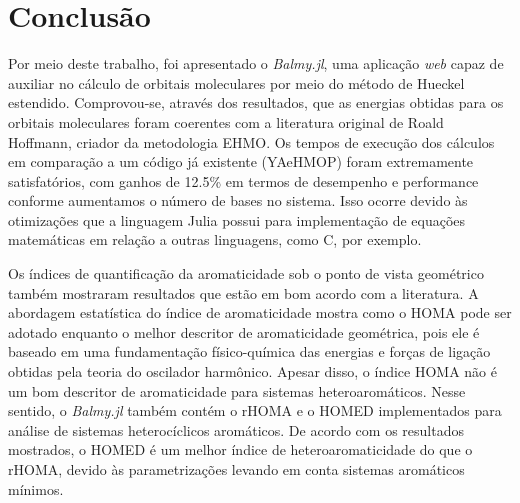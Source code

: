 \chapter{Conclusão}

Por meio deste trabalho, foi apresentado o \textit{Balmy.jl}, uma aplicação \textit{web} capaz de auxiliar no cálculo de orbitais moleculares por meio do método de Hueckel estendido. Comprovou-se, através dos resultados, que as energias obtidas para os orbitais moleculares foram coerentes com a literatura original de Roald Hoffmann, criador da metodologia \gls{EHMO}. Os tempos de execução dos cálculos em comparação a um código já existente (\gls{YAeHMOP}) foram extremamente satisfatórios, com ganhos de 12.5\% em termos de desempenho e performance conforme aumentamos o número de bases no sistema. Isso ocorre devido às otimizações que a linguagem Julia possui para implementação de equações matemáticas em relação a outras linguagens, como C, por exemplo.

Os índices de quantificação da aromaticidade sob o ponto de vista geométrico também mostraram resultados que estão em bom acordo com a literatura. A abordagem estatística do índice de aromaticidade mostra como o \gls{HOMA} pode ser adotado enquanto o melhor descritor de aromaticidade geométrica, pois ele é baseado em uma fundamentação físico-química das energias e forças de ligação obtidas pela teoria do oscilador harmônico. Apesar disso, o índice \gls{HOMA} não é um bom descritor de aromaticidade para sistemas heteroaromáticos. Nesse sentido, o \textit{Balmy.jl} também contém o \gls{rHOMA} e o \gls{HOMED} implementados para análise de sistemas heterocíclicos aromáticos. De acordo com os resultados mostrados, o \gls{HOMED} é um melhor índice de heteroaromaticidade do que o \gls{rHOMA}, devido às parametrizações levando em conta sistemas aromáticos mínimos.